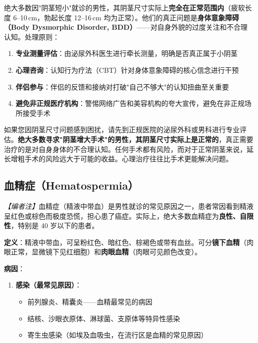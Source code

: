 \begin{enumerate}
绝大多数因"阴茎短小"就诊的男性，其阴茎尺寸实际上\textbf{完全在正常范围内}（疲软长度 6--10\,cm，勃起长度 12--16\,cm 均为正常）。他们的真正问题是\textbf{身体意象障碍（Body Dysmorphic Disorder, BDD）}——对自身外貌的过度关注和不合理认知。处理原则：
\begin{enumerate}
	\item \textbf{专业测量评估}：由泌尿外科医生进行牵长测量，明确是否真正属于小阴茎
	\item \textbf{心理咨询}：认知行为疗法（CBT）针对身体意象障碍的核心信念进行干预
	\item \textbf{伴侣参与}：伴侣的反馈和接纳对打破"自己不够大"的认知扭曲至关重要
	\item \textbf{避免非正规医疗机构}：警惕网络广告和美容机构的夸大宣传，避免在非正规场所接受手术
\end{enumerate}

\begin{tcolorbox}[colback=pink!5!white,colframe=red!50!black,title=贴心小叮咛]
如果您因阴茎尺寸问题感到困扰，请先到正规医院的泌尿外科或男科进行专业评估。\textbf{绝大多数寻求"阴茎增大手术"的男性，其阴茎尺寸实际上是正常的}，真正需要治疗的是对自身身体的不合理认知。任何手术都有风险，而对于正常阴茎来说，延长增粗手术的风险远大于可能的收益。心理治疗往往比手术更能解决问题。
\end{tcolorbox}

\subsection{血精症（Hematospermia）}
\label{subsec:hematospermia}

\noindent\textit{【编者注】}血精症（精液中带血）是男性就诊的常见原因之一，患者常因看到精液呈红色或棕色而极度恐慌，担心患了癌症。实际上，绝大多数血精症为\textbf{良性、自限性}，特别是 40 岁以下的患者。

\vspace{0.5em}
\noindent\textbf{定义}：精液中带血，可呈粉红色、暗红色、棕褐色或带有血丝。可分\textbf{镜下血精}（肉眼正常，显微镜下见红细胞）和\textbf{肉眼血精}（肉眼可见颜色改变）。

\vspace{0.5em}
\noindent\textbf{病因}：

\begin{enumerate}
	\item \textbf{感染（最常见原因）}：
	\begin{itemize}
		\item 前列腺炎、精囊炎——血精最常见的病因
		\item 结核、沙眼衣原体、淋球菌、支原体等特异性感染
		\item 寄生虫感染（如埃及血吸虫，在流行区是血精的常见原因）
	\end{itemize}


\end{enumerate}
\end{enumerate}
